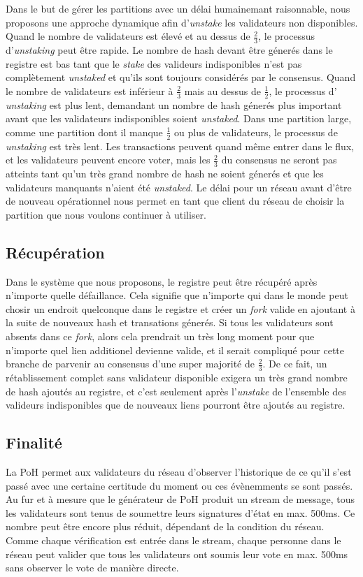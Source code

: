 \documentclass[12pt]{article}
\begin{document}
Dans le but de gérer les partitions avec un délai humainemant raisonnable, nous proposons une approche dynamique afin d'\textit{unstake} les validateurs non disponibles. Quand le nombre de validateurs est élevé et au dessus de \(\frac{2}{3}\), le processus d'\textit{unstaking} peut être rapide. Le nombre de hash devant être génerés dans le registre est bas tant que le \textit{stake} des valideurs indisponibles n'est pas complètement \textit{unstaked} et qu'ils sont toujours considérés par le consensus. Quand le nombre de validateurs est inférieur à \(\frac{2}{3}\) mais au dessus de  \(\frac{1}{2}\), le processus d' \textit{unstaking} est plus lent, demandant un nombre de hash génerés plus important avant que les validateurs indisponibles soient \textit{unstaked}. Dans une partition large, comme une partition dont il manque \(\frac{1}{2}\) ou plus de validateurs, le processus de \textit{unstaking} est très lent. Les transactions peuvent quand même entrer dans le flux, et les validateurs peuvent encore voter, mais les \(\frac{2}{3}\) du consensus ne seront pas atteints tant qu'un très grand nombre de hash ne soient génerés et que les validateurs manquants n'aient été \textit{unstaked}. Le délai pour un réseau avant d'être de nouveau opérationnel nous permet en tant que client du réseau de choisir la partition que nous voulons continuer à utiliser.

\subsection{Récupération}\label{disponibility}
Dans le système que nous proposons, le registre peut être récupéré après n'importe quelle défaillance. Cela signifie que n'importe qui dans le monde peut chosir un endroit quelconque dans le registre et créer un \textit{fork} valide en ajoutant à la suite de nouveaux hash et transations génerés. Si tous les validateurs sont absents dans ce \textit{fork}, alors cela prendrait un très long moment pour que n'importe quel lien additionel devienne valide, et il serait compliqué pour cette branche de parvenir au consensus d'une super majorité de \(\frac{2}{3}\). De ce fait, un rétablissement complet sans validateur disponible exigera un très grand nombre de hash ajoutés au registre, et c'est seulement après l'\textit{unstake} de l'ensemble des valideurs indisponibles que de nouveaux liens pourront être ajoutés au registre.

\subsection{Finalité}\label{disponibility}
La PoH permet aux validateurs du réseau d'observer l'historique de ce qu'il s'est passé avec une certaine certitude du moment ou ces évènemments se sont passés. Au fur et à mesure que le générateur de PoH produit un stream de message, tous les validateurs sont tenus de soumettre leurs signatures d'état en max. 500ms. Ce nombre peut être encore plus réduit, dépendant de la condition du réseau. Comme chaque vérification est entrée dans le stream, chaque personne dans le réseau peut valider que tous les validateurs ont soumis leur vote en max. 500ms sans observer le vote de manière directe.
\end{document}
